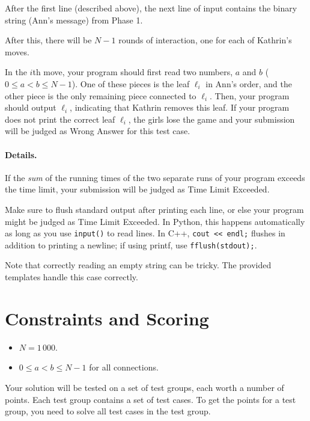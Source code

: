 After the first line (described above), the next line of input contains the binary string (Ann's message) from Phase 1.

After this, there will be $N-1$ rounds of interaction, one for each of Kathrin's moves. 

In the $i$th move, 
your program should first read two numbers, $a$ and $b$  ($0\le a < b \le N-1$).
One of these pieces is the leaf $\ell_i$ in Ann's order, and the other piece is the only remaining piece connected to $\ell_i$. 
Then, your program should output $\ell_i$, indicating that Kathrin removes this leaf. If your program does not print the correct leaf $\ell_i$, the girls lose the game and your submission will be judged as Wrong Answer for this test case.


\paragraph{Details.}
If the \textit{sum} of the running times of the two separate runs of your program exceeds the time limit, your submission will be judged as Time Limit Exceeded.

Make sure to flush standard output after printing each line, or else your program might be judged as Time Limit Exceeded.
In Python, this happens automatically as long as you use \texttt{input()} to read lines. In C++, \texttt{cout << endl;} flushes in addition to printing a newline; if using printf, use \texttt{fflush(stdout);}.

Note that correctly reading an empty string can be tricky. The provided templates handle this case correctly.

\section*{Constraints and Scoring}
\begin{itemize}
    \item $N = 1\,000$.
    \item $0 \le a < b \le N-1$ for all connections.
\end{itemize}

Your solution will be tested on a set of test groups, each worth a number of points.
Each test group contains a set of test cases. To get the points for a test group, you need to
solve all test cases in the test group.

